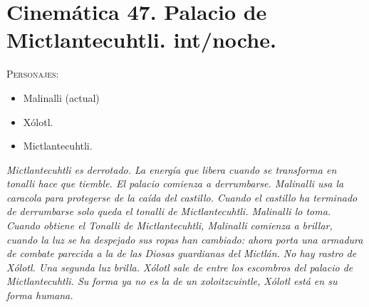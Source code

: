 \documentclass[11pt,letterpaper]{article}
\begin{document}
\section{Cinemática 47. Palacio de Mictlantecuhtli. int/noche.}
 \textsc{Personajes}:
 \begin{itemize}
 \item Malinalli (actual)
 \item Xólotl.
 \item Mictlantecuhtli.
 \end{itemize}
\textit{Mictlantecuhtli es derrotado.  La energía que libera cuando se transforma en tonalli hace que tiemble. El palacio comienza a derrumbarse. Malinalli usa la caracola para protegerse de la caída del castillo. Cuando el castillo ha terminado de derrumbarse solo queda el tonalli de Mictlantecuhtli. Malinalli lo toma. Cuando obtiene el Tonalli de Mictlantecuhtli, Malinalli comienza a brillar, cuando la luz se ha despejado sus ropas han cambiado: ahora porta una armadura de combate parecida a la de las Diosas guardianas del Mictlán. No hay rastro de Xólotl. Una segunda luz brilla. Xólotl sale de entre los escombros del palacio de Mictlantecuhtli. Su forma ya no es la de un xoloitzcuintle, Xólotl está en su forma humana. }
\end{document}
